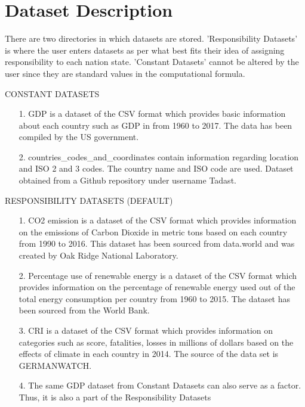 \documentclass[fontsize=11pt]{article}
\begin{document}
\section*{Dataset Description}

    There are two directories in which datasets are stored. 'Responsibility Datasets' is where the user enters datasets as per what best fits their idea of assigning responsibility to each nation state. 'Constant Datasets' cannot be altered by the user since they are standard values in the computational formula.


     \begin{center}
        CONSTANT DATASETS
    \end{center}

    \begin{enumerate}


        \item [1.] GDP is a dataset of the CSV format which provides basic information about each country such as GDP in from 1960 to 2017. The data has been compiled by the US government.

        \item [2.]  countries\_codes\_and\_coordinates contain information regarding location and ISO 2 and 3 codes.  The country name and ISO code are used.  Dataset obtained from a Github repository under username Tadast.

    \end{enumerate} \newpage

    \begin{center}
        RESPONSIBILITY DATASETS (DEFAULT)
    \end{center}

    \begin{enumerate}
        \item [1.] CO2 emission is a dataset of the CSV format which provides information on the emissions of Carbon Dioxide in metric tons based on each country from 1990 to 2016. This dataset has been sourced from data.world and was created by Oak Ridge National Laboratory.

        \item [2.] Percentage use of renewable energy is a dataset of the CSV format which provides information on the percentage of renewable energy used out of the total energy consumption per country from 1960 to 2015. The dataset has been sourced from the World Bank.

        \item [3.] CRI is a dataset of the CSV format which provides information on categories such as score, fatalities, losses in millions of dollars based on the effects of climate in each country in 2014. The source of the data set is GERMANWATCH.

        \item [4.] The same GDP dataset from Constant Datasets can also serve as a factor. Thus, it is also a part of the Responsibility Datasets

    \end{enumerate}
\end{document}
